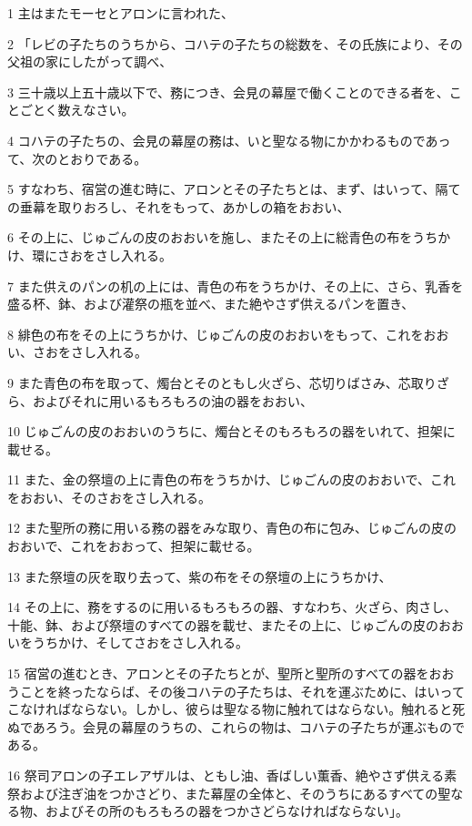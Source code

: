\par 1 主はまたモーセとアロンに言われた、
\par 2 「レビの子たちのうちから、コハテの子たちの総数を、その氏族により、その父祖の家にしたがって調べ、
\par 3 三十歳以上五十歳以下で、務につき、会見の幕屋で働くことのできる者を、ことごとく数えなさい。
\par 4 コハテの子たちの、会見の幕屋の務は、いと聖なる物にかかわるものであって、次のとおりである。
\par 5 すなわち、宿営の進む時に、アロンとその子たちとは、まず、はいって、隔ての垂幕を取りおろし、それをもって、あかしの箱をおおい、
\par 6 その上に、じゅごんの皮のおおいを施し、またその上に総青色の布をうちかけ、環にさおをさし入れる。
\par 7 また供えのパンの机の上には、青色の布をうちかけ、その上に、さら、乳香を盛る杯、鉢、および灌祭の瓶を並べ、また絶やさず供えるパンを置き、
\par 8 緋色の布をその上にうちかけ、じゅごんの皮のおおいをもって、これをおおい、さおをさし入れる。
\par 9 また青色の布を取って、燭台とそのともし火ざら、芯切りばさみ、芯取りざら、およびそれに用いるもろもろの油の器をおおい、
\par 10 じゅごんの皮のおおいのうちに、燭台とそのもろもろの器をいれて、担架に載せる。
\par 11 また、金の祭壇の上に青色の布をうちかけ、じゅごんの皮のおおいで、これをおおい、そのさおをさし入れる。
\par 12 また聖所の務に用いる務の器をみな取り、青色の布に包み、じゅごんの皮のおおいで、これをおおって、担架に載せる。
\par 13 また祭壇の灰を取り去って、紫の布をその祭壇の上にうちかけ、
\par 14 その上に、務をするのに用いるもろもろの器、すなわち、火ざら、肉さし、十能、鉢、および祭壇のすべての器を載せ、またその上に、じゅごんの皮のおおいをうちかけ、そしてさおをさし入れる。
\par 15 宿営の進むとき、アロンとその子たちとが、聖所と聖所のすべての器をおおうことを終ったならば、その後コハテの子たちは、それを運ぶために、はいってこなければならない。しかし、彼らは聖なる物に触れてはならない。触れると死ぬであろう。会見の幕屋のうちの、これらの物は、コハテの子たちが運ぶものである。
\par 16 祭司アロンの子エレアザルは、ともし油、香ばしい薫香、絶やさず供える素祭および注ぎ油をつかさどり、また幕屋の全体と、そのうちにあるすべての聖なる物、およびその所のもろもろの器をつかさどらなければならない」。
